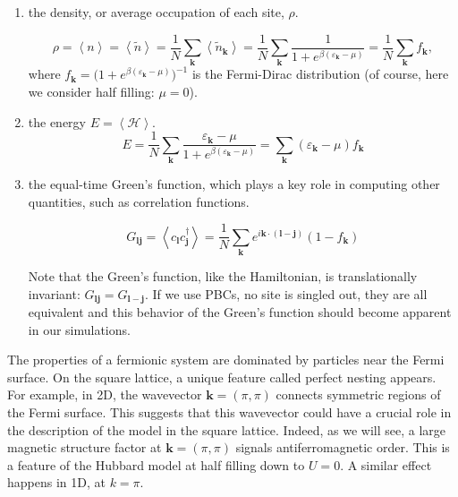 \begin{enumerate}
\item the density, or average occupation of each site, $\rho$.

\begin{equation}
\rho = \left\langle n \right\rangle = \left\langle \tilde{n} \right\rangle = \frac{1}{N} \sum_{{\bm k}} \left\langle \tilde{n}_{\bm k} \right\rangle  = \frac{1}{N} \sum_{\bm k}  \frac{1}{1 + e^{\beta (\varepsilon_{\bm k} - \mu)}} = \frac{1}{N} \sum_{\bm k}  f_{\bm k} ,
\end{equation}
where $f_{\bm k} = \big(1 + e^{\beta(\varepsilon_{\bm k} - \mu)} \big)^{-1}$ is the Fermi-Dirac distribution (of course, here we consider half filling: $\mu = 0$).

\item the energy $E = \left\langle \mathcal{H} \right\rangle$.
\begin{equation}
E = \frac{1}{N} \sum_{\bm k} \frac{\varepsilon_{\bm k} - \mu}{1 + e^{\beta(\varepsilon_{\bm k} - \mu)}} = \sum_{\bm k} (\varepsilon_{\bm k} - \mu) f_{\bm k}
\end{equation}

\item the equal-time Green's function, which plays a key role in computing other quantities, such as correlation functions.

\begin{equation}\label{eq:eqGreenNonInt}
G_{\bm l \bm j} = \left\langle c_{\bm l} c_{\bm j}^\dagger \right\rangle = \frac{1}{N} \sum_{\bm k} e^{ i {\bm k} \cdot ( \bm l -\bm  j ) } ( 1 - f_{\bm k} )
\end{equation}

Note that the Green's function, like the Hamiltonian, is translationally invariant: $G_{\bm l \bm j} = G_{\bm l-\bm j}$. 
If we use PBCs, no site is singled out, they are all equivalent and this behavior of the Green's function should become apparent in our simulations.
\end{enumerate}

The properties of a fermionic system are dominated by particles near the Fermi surface.
On the square lattice, a unique feature called perfect nesting appears. 
For example, in \acs{2D}, the wavevector $\bm k = (\pi , \pi)$ connects symmetric regions of the Fermi surface.
This suggests that this wavevector could have a crucial role in the description of the model in the square lattice.
Indeed, as we will see, a large magnetic structure factor at $\bm k = (\pi , \pi)$ signals antiferromagnetic order.
This is a feature of the Hubbard model at half filling down to $U = 0$.
A similar effect happens in \acs{1D}, at $k = \pi$.


